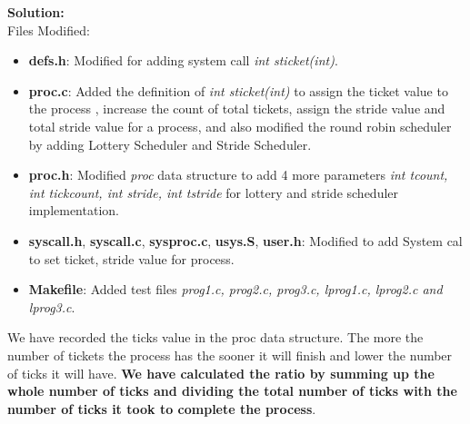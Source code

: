 \documentclass[a4paper, 10pt]{article}
\begin{document}
\noindent
\large\textbf{Solution:}\\
Files Modified:
\begin{itemize}
	\item \textbf{defs.h}: Modified for adding system call  \emph{int sticket(int)}.
	\item \textbf{proc.c}:  Added the definition of \emph{int sticket(int)} to assign the ticket value to the process , increase the count of total tickets, assign the stride value and total stride value for a process, and also modified the round robin scheduler by adding Lottery Scheduler and Stride Scheduler. 
	\item \textbf{proc.h}: Modified \emph{proc} data structure to add 4 more parameters \emph{int tcount,	int tickcount, int stride,	int tstride} for lottery and stride scheduler implementation.
	\item \textbf{syscall.h}, \textbf{syscall.c}, \textbf{sysproc.c}, \textbf{usys.S}, \textbf{user.h}: Modified to add System cal to set ticket, stride value for process.
	\item \textbf{Makefile}:  Added test files \emph{prog1.c, prog2.c, prog3.c, lprog1.c, lprog2.c and lprog3.c}.\\
\end{itemize}
We have recorded the ticks value in the proc data structure. The more the number of tickets the process has the sooner it will finish and lower the number of ticks it will have. \textbf{We have calculated the ratio by summing up the whole number of ticks and dividing the total number of ticks with the number of ticks it took to complete the process}.\\
\end{document}
